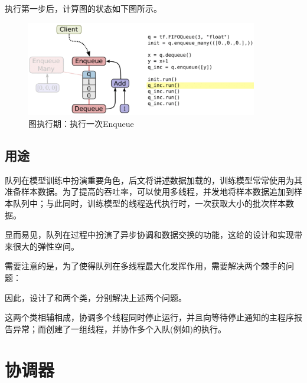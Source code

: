 \begin{content}
执行第一步后，计算图的状态如下图所示。

\begin{figure}[!h]
\centering
\includegraphics[width=0.9\textwidth]{figures/py-queue-example-3.png}
\caption{图执行期：执行一次Enqueue}
 \label{fig:py-queue-example-3}
\end{figure}

\subsection{用途}

队列在模型训练中扮演重要角色，后文将讲述数据加载的，训练模型常常使用为其准备样本数据。为了提高的吞吐率，可以使用多线程，并发地将样本数据追加到样本队列中；与此同时，训练模型的线程迭代执行时，一次获取大小的批次样本数据。

显而易见，队列在过程中扮演了异步协调和数据交换的功能，这给的设计和实现带来很大的弹性空间。

需要注意的是，为了使得队列在多线程最大化发挥作用，需要解决两个棘手的问题：

\begin{enum}
\end{enum}

因此，设计了和两个类，分别解决上述两个问题。

这两个类相辅相成，协调多个线程同时停止运行，并且向等待停止通知的主程序报告异常；而创建了一组线程，并协作多个入队(例如)的执行。

\end{content}

\section{协调器}

